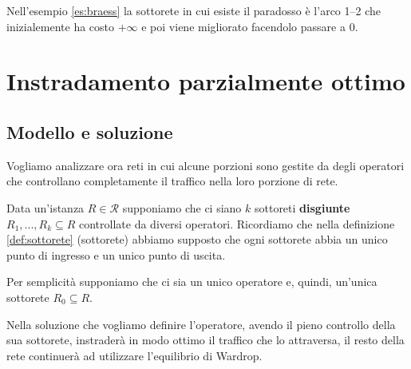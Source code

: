 \documentclass[a4paper]{article}
\theoremstyle{plain}
\theoremstyle{definition}
\theoremstyle{remark}
\begin{document}
Nell'esempio \ref{es:braess} la sottorete in cui esiste il paradosso è
l'arco 1--2 che inizialemente ha costo $+\infty$ e poi viene
migliorato facendolo passare a $0$.

\section{Instradamento parzialmente ottimo}

\subsection{Modello e soluzione}
\label{sec:por-modello}

Vogliamo analizzare ora reti in cui alcune porzioni sono gestite da
degli operatori che controllano completamente il traffico nella loro
porzione di rete.

Data un'istanza $R\in \mathcal{R}$ supponiamo che ci siano $k$
sottoreti \textbf{disgiunte} $R_1,...,R_k \subseteq R$ controllate da
diversi operatori. Ricordiamo che nella definizione
\ref{def:sottorete} (sottorete) abbiamo supposto che ogni sottorete
abbia un unico punto di ingresso e un unico punto di uscita.

Per semplicità supponiamo che ci sia un unico operatore e, quindi,
un'unica sottorete $R_0 \subseteq R$.

Nella soluzione che vogliamo definire l'operatore, avendo il pieno
controllo della sua sottorete, instraderà in modo ottimo il traffico
che lo attraversa, il resto della rete continuerà ad utilizzare
l'equilibrio di Wardrop.
\end{document}
